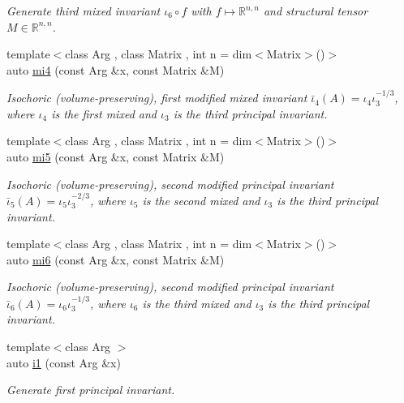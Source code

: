 \begin{DoxyCompactItemize}
\begin{DoxyCompactList}\small\item\em Generate third mixed invariant $ \iota_6\circ f $ with $f\mapsto\mathbb{R}^{n,n}$ and structural tensor $M\in\mathbb{R}^{n,n}$. \end{DoxyCompactList}\item 
{\footnotesize template$<$class Arg , class Matrix , int n = dim$<$\+Matrix$>$()$>$ }\\auto \hyperlink{group__InvariantGroup_ga7ee54c5d056877bdefefb8e54ad17791}{mi4} (const Arg \&x, const Matrix \&M)
\begin{DoxyCompactList}\small\item\em Isochoric (volume-\/preserving), first modified mixed invariant $ \bar\iota_4(A)=\iota_4\iota_3^{-1/3} $, where $\iota_4$ is the first mixed and $\iota_3$ is the third principal invariant. \end{DoxyCompactList}\item 
{\footnotesize template$<$class Arg , class Matrix , int n = dim$<$\+Matrix$>$()$>$ }\\auto \hyperlink{group__InvariantGroup_ga189bc682b34d13902da335c5eb502faa}{mi5} (const Arg \&x, const Matrix \&M)
\begin{DoxyCompactList}\small\item\em Isochoric (volume-\/preserving), second modified principal invariant $ \bar\iota_5(A)=\iota_5\iota_3^{-2/3} $, where $\iota_5$ is the second mixed and $\iota_3$ is the third principal invariant. \end{DoxyCompactList}\item 
{\footnotesize template$<$class Arg , class Matrix , int n = dim$<$\+Matrix$>$()$>$ }\\auto \hyperlink{group__InvariantGroup_ga3e451f9e15fa95080f81d0c0f69f93e6}{mi6} (const Arg \&x, const Matrix \&M)
\begin{DoxyCompactList}\small\item\em Isochoric (volume-\/preserving), second modified principal invariant $ \bar\iota_6(A)=\iota_6\iota_3^{-1/3} $, where $\iota_6$ is the third mixed and $\iota_3$ is the third principal invariant. \end{DoxyCompactList}\item 
{\footnotesize template$<$class Arg $>$ }\\auto \hyperlink{group__InvariantGroup_gafaead59b618d87239270f8eca2bf75c8}{i1} (const Arg \&x)
\begin{DoxyCompactList}\small\item\em Generate first principal invariant. \end{DoxyCompactList}\item 

\end{DoxyCompactItemize}
